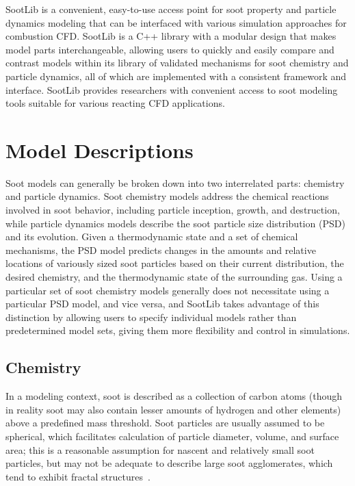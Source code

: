 \documentclass[preprint,letterpaper]{elsarticle}
\begin{document}
SootLib is a convenient, easy-to-use access point for soot property and particle dynamics modeling that can be interfaced with various simulation approaches for combustion CFD.
SootLib is a C++ library with a modular design that makes model parts interchangeable, allowing users to quickly and easily compare and contrast models within its library of validated mechanisms for soot chemistry and particle dynamics, all of which are implemented with a consistent framework and interface. SootLib provides researchers with convenient access to soot modeling tools suitable for various reacting CFD applications.


\section{Model Descriptions}
\label{s:models}

Soot models can generally be broken down into two interrelated parts: chemistry and particle dynamics. Soot chemistry models address the chemical reactions involved in soot behavior, including particle inception, growth, and destruction, while particle dynamics models describe the soot particle size distribution (PSD) and its evolution. Given a thermodynamic state and a set of chemical mechanisms, the PSD model predicts changes in the amounts and relative locations of variously sized soot particles based on their current distribution, the desired chemistry, and the thermodynamic state of the surrounding gas. Using a particular set of soot chemistry models generally does not necessitate using a particular PSD model, and vice versa, and SootLib takes advantage of this distinction by allowing users to specify individual models rather than predetermined model sets, giving them more flexibility and control in simulations.

\subsection{Chemistry}
\label{ss:chemistry}

In a modeling context, soot is described as a collection of carbon atoms (though in reality soot may also contain lesser amounts of hydrogen and other elements) above a predefined mass threshold. Soot particles are usually assumed to be spherical, which facilitates calculation of particle diameter, volume, and surface area; this is a reasonable assumption for nascent and relatively small soot particles, but may not be adequate to describe large soot agglomerates, which tend to exhibit fractal structures~\cite{Jullien_1987,Wang_2011}.
\end{document}
